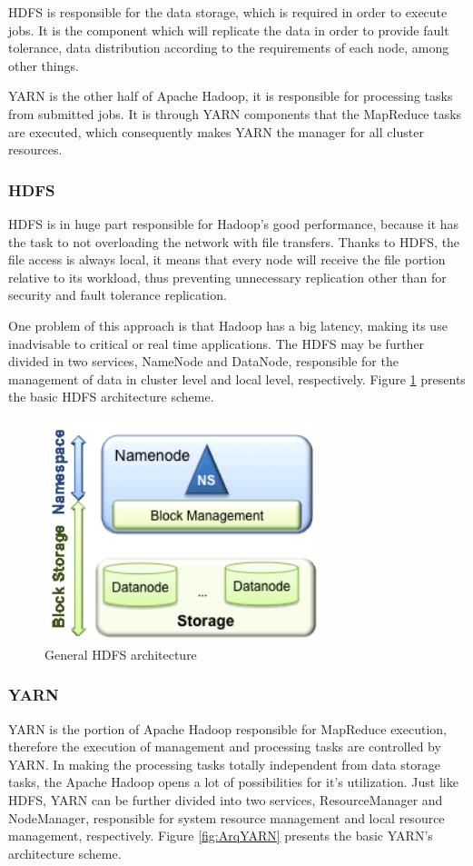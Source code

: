HDFS is responsible for the data storage, which is required in order to execute jobs. It is the component which will replicate the data in order to provide fault tolerance, data distribution according to the requirements of each node, among other things.

YARN is the other half of Apache Hadoop, it is responsible for processing tasks from submitted jobs. It is through YARN components that the MapReduce tasks are executed, which consequently makes YARN the manager for all cluster resources.

\subsubsection{HDFS}
HDFS is in huge part responsible for Hadoop's good performance, because it has the task to not overloading the network with file transfers. Thanks to HDFS, the file access is always local, it means that every node will receive the file portion relative to its workload, thus preventing unnecessary replication other than for security and fault tolerance replication.

One problem of this approach is that Hadoop has a big latency, making its use inadvisable to critical or real time applications. The HDFS may be further divided in two services, NameNode and DataNode, responsible for the management of data in cluster level and local level, respectively. Figure \ref{fig:ArqHDFS} presents the basic HDFS architecture scheme.

\begin{figure}[hbtn]
   \renewcommand{\figurename}{Figure}
   \centering
   \includegraphics[width=8cm]{figuras/Figura07-HDFS.png}
   \caption{General HDFS architecture \cite{HDFS}}
   \label{fig:ArqHDFS}
\end{figure}

\subsubsection{YARN}
YARN is the portion of Apache Hadoop responsible for MapReduce execution, therefore the execution of management and processing tasks are controlled by YARN. In making the processing tasks totally independent from data storage tasks, the Apache Hadoop opens a lot of possibilities for it's utilization. Just like HDFS, YARN can be further divided into two services, ResourceManager and NodeManager, responsible for system resource management and local resource management, respectively. Figure \ref{fig:ArqYARN} presents the basic YARN's architecture scheme.

